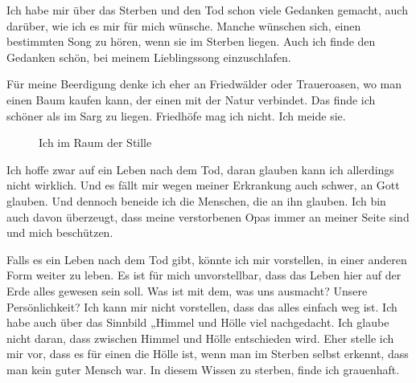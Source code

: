 \documentclass[fontsize=14pt,a4paper,headinclude,DIV=calc,automark]{scrbook}
\begin{document}
Ich habe mir über das Sterben und den Tod schon viele Gedanken gemacht, auch darüber, wie ich es mir für mich wünsche. Manche wünschen sich, einen bestimmten Song zu hören, wenn sie im Sterben liegen. Auch ich finde den Gedanken schön, bei meinem Lieblingssong einzuschlafen.

Für meine Beerdigung denke ich eher an Friedwälder oder Traueroasen, wo man einen Baum kaufen kann, der einen mit der Natur verbindet. Das finde ich schöner als im Sarg zu liegen. Friedhöfe mag ich nicht. Ich meide sie. 

\setlength{\fboxsep}{0pt}    %
\setlength{\fboxrule}{0.2pt} %
\begin{figure}[H]
    \centering
    \caption{Ich im Raum der Stille}
    \label{fig:marius_im_raum_der_stille}
\end{figure}

Ich hoffe zwar auf ein Leben nach dem Tod, daran glauben kann ich allerdings nicht wirklich. Und es fällt mir wegen meiner Erkrankung auch schwer, an Gott glauben. Und dennoch beneide ich die Menschen, die an ihn glauben. Ich bin auch davon überzeugt, dass meine verstorbenen Opas immer an meiner Seite sind und mich beschützen.

Falls es ein Leben nach dem Tod gibt, könnte ich mir vorstellen, in einer anderen Form weiter zu leben. Es ist für mich unvorstellbar, dass das Leben hier auf der Erde alles gewesen sein soll. Was ist mit dem, was uns ausmacht? Unsere Persönlichkeit? Ich kann mir nicht vorstellen, dass das alles einfach weg ist. Ich habe auch über das Sinnbild „Himmel und Hölle viel nachgedacht. Ich glaube nicht daran, dass zwischen Himmel und Hölle entschieden wird. Eher stelle ich mir vor, dass es für einen die Hölle ist, wenn man im Sterben selbst erkennt, dass man kein guter Mensch war. In diesem Wissen zu sterben, finde ich grauenhaft.
\end{document}
